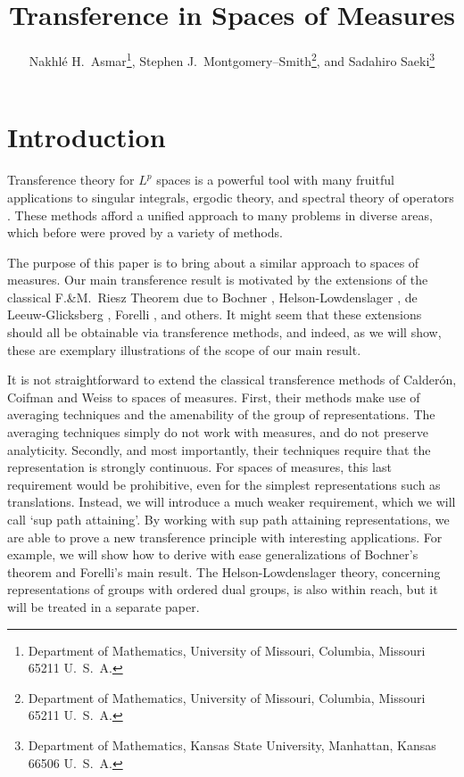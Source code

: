 \documentclass[12pt]{article}
\begin{document}
\title{Transference in Spaces of Measures}

\author{Nakhl\'e H.\ Asmar\footnote{
Department of Mathematics,
University of
Missouri,
Columbia, Missouri 65211  U.\ S.\ A.
}, 
 Stephen J.\ Montgomery--Smith\footnote{
Department of Mathematics,
University of
Missouri,
Columbia, Missouri 65211  U.\ S.\ A.
}, and Sadahiro Saeki\footnote{
Department of Mathematics,
Kansas State University,
Manhattan, Kansas 66506  U.\ S.\ A.
}
\date{}
}
\maketitle
\section{Introduction}

\renewcommand{\thefootnote}{\roman{footnote}}


Transference theory for $L^p$ spaces is a powerful tool with
many fruitful applications to singular integrals, ergodic
theory, and spectral theory of operators \cite{cal,cw}.
These methods afford a unified approach to many problems
in diverse areas, which before were proved by a variety of methods.

The purpose of this paper is to bring about a similar approach to spaces of measures.  Our main transference result is 
motivated by the extensions of the classical F.\&M.~Riesz Theorem 
due to Bochner
 \cite{bs},
Helson-Lowdenslager \cite{hl1, hl2}, 
de Leeuw-Glicksberg \cite{deleeuwglicksberg}, 
Forelli \cite{forelli}, and others.  It might seem
that these extensions should all be obtainable 
via transference methods,
and indeed, as we will show, these are exemplary 
illustrations
of the scope of our main result.

It is not straightforward to extend the classical transference methods
of Calder\'on, Coifman and Weiss to spaces of measures.  
First, their methods make use of 
averaging techniques and the amenability of the group of representations.
The averaging techniques simply do not work with
measures, and do not preserve analyticity.  Secondly, and most importantly,
their techniques require that the representation is strongly continuous.
For spaces of measures, this last requirement would be prohibitive, 
even for the simplest representations such as translations.  Instead, we
will introduce a much weaker requirement, which we will call `sup path
attaining'.  By working with sup path attaining representations, we are
 able to prove a new transference principle with interesting applications.
For example, we will show how to derive with ease generalizations of Bochner's theorem and Forelli's main result.  The Helson-Lowdenslager theory, concerning representations of groups with ordered dual groups, 
is also within reach, but it will
be treated in a separate paper. 
\end{document}
